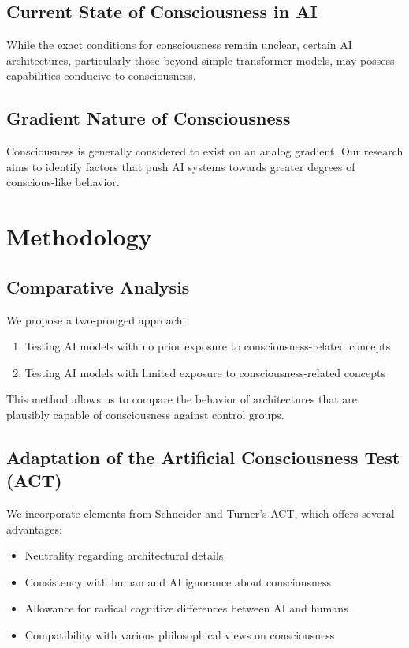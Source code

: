\documentclass{article}
\begin{document}
\subsection{Current State of Consciousness in AI}
While the exact conditions for consciousness remain unclear, certain AI architectures, particularly those beyond simple transformer models, may possess capabilities conducive to consciousness.

\subsection{Gradient Nature of Consciousness}
Consciousness is generally considered to exist on an analog gradient. Our research aims to identify factors that push AI systems towards greater degrees of conscious-like behavior.

\section{Methodology}
\subsection{Comparative Analysis}
We propose a two-pronged approach:
\begin{enumerate}
    \item Testing AI models with no prior exposure to consciousness-related concepts
    \item Testing AI models with limited exposure to consciousness-related concepts
\end{enumerate}

This method allows us to compare the behavior of architectures that are plausibly capable of consciousness against control groups.

\subsection{Adaptation of the Artificial Consciousness Test (ACT)}
We incorporate elements from Schneider and Turner's ACT, which offers several advantages:
\begin{itemize}
    \item Neutrality regarding architectural details
    \item Consistency with human and AI ignorance about consciousness
    \item Allowance for radical cognitive differences between AI and humans
    \item Compatibility with various philosophical views on consciousness
\end{itemize}
\end{document}
